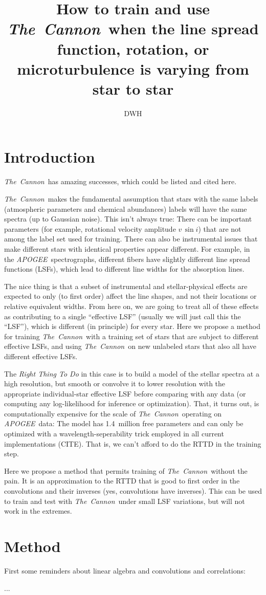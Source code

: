 \documentclass[12pt, preprint]{aastex}
\newcommand{\acronym}[1]{{\small{#1}}}
\newcommand{\project}[1]{\textsl{#1}}
\newcommand{\tc}{\project{The~Cannon}}
\newcommand{\apogee}{\project{\acronym{APOGEE}}}
\begin{document}
\title{How to train and use \tc\ when the line spread function, rotation, or microturbulence is varying from star to star}
\author{DWH}

\section{Introduction}

\tc\ has amazing successes, which could be listed and cited here.

\tc\ makes the fundamental assumption that stars with the same labels
(atmospheric parameters and chemical abundances) labels will have the
same spectra (up to Gaussian noise).
This isn't always true:
There can be important parameters (for example, rotational velocity
amplitude $v\,\sin i$) that are not among the label set used for
training.
There can also be instrumental issues that make different stars with
identical properties appear different.
For example, in the \apogee\ spectrographs, different fibers have
slightly different line spread functions (\acronym{LSF}s), which lead
to different line widths for the absorption lines.

The nice thing is that a subset of instrumental and stellar-physical
effects are expected to only (to first order) affect the line shapes,
and not their locations or relative equivalent widths.
From here on, we are going to treat all of these effects as
contributing to a single ``effective \acronym{LSF}'' (usually we will
just call this the ``\acronym{LSF}''), which is different (in
principle) for every star.
Here we propose a method for training \tc\ with a training set of
stars that are subject to different effective \acronym{LSF}s, and using \tc\ on
new unlabeled stars that also all have different effective \acronym{LSF}s.

The \emph{Right Thing To Do} in this case is to build a model of the
stellar spectra at a high resolution, but smooth or convolve it to
lower resolution with the appropriate individual-star effective
\acronym{LSF} before comparing with any data (or computing any
log-likelihood for inference or optimization).
That, it turns out, is computationally expensive for the scale of
\tc\ operating on \apogee\ data:
The model has 1.4~million free parameters and can only be optimized
with a wavelength-seperability trick employed in all current
implementations (CITE).
That is, we can't afford to do the \acronym{RTTD} in the training
step.

Here we propose a method that permits training of \tc\ without the pain.
It is an approximation to the \acronym{RTTD} that is good to first order
in the convolutions and their inverses (yes, convolutions have inverses).
This can be used to train and test with \tc\ under small \acronym{LSF}
variations, but will not work in the extremes.

\section{Method}

First some reminders about linear algebra and convolutions and
correlations:

...
\end{document}
